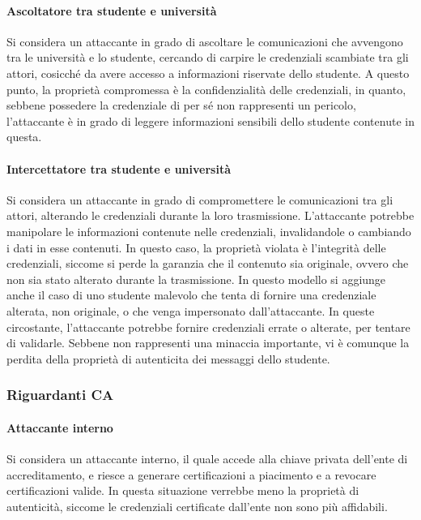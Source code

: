 \documentclass[a4paper,12pt]{article}
\begin{document}
\paragraph{Ascoltatore tra studente e università} Si considera un attaccante in grado di ascoltare le comunicazioni che avvengono tra le università e lo studente, cercando di carpire le credenziali scambiate tra gli attori, cosicché da avere accesso a informazioni riservate dello studente.
\newline A questo punto, la proprietà compromessa è la confidenzialità delle credenziali, in quanto, sebbene possedere la credenziale di per sé non rappresenti un pericolo, l'attaccante è in grado di leggere informazioni sensibili dello studente contenute in questa.
\paragraph{Intercettatore tra studente e università} Si considera un attaccante in grado di compromettere le comunicazioni tra gli attori, alterando le credenziali durante la loro trasmissione. L'attaccante potrebbe manipolare le informazioni contenute nelle credenziali, invalidandole o cambiando i dati in esse contenuti.
\newline In questo caso, la proprietà violata è l'integrità delle credenziali, siccome si perde la garanzia che il contenuto sia originale, ovvero che non sia stato alterato durante la trasmissione.
\newline In questo modello si aggiunge anche il caso di uno studente malevolo che tenta di fornire una credenziale alterata, non originale, o che venga impersonato dall'attaccante. In queste circostante, l'attaccante potrebbe fornire credenziali errate o alterate, per tentare di validarle.
\newline Sebbene non rappresenti una minaccia importante, vi è comunque la perdita della proprietà di autenticita dei messaggi dello studente.
\subsubsection{Riguardanti CA}
\paragraph{Attaccante interno} Si considera un attaccante interno, il quale accede alla chiave privata dell'ente di accreditamento, e riesce a generare certificazioni a piacimento e a revocare certificazioni valide.
In questa situazione verrebbe meno la proprietà di autenticità, siccome le credenziali certificate dall'ente non sono più affidabili.
\end{document}
